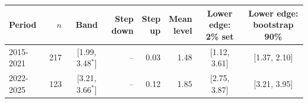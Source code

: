 \begin{tabular}{lrcrrrcc}\toprule
Period & $n$ & Band & \hd{Step\\down} & \hd{Step\\up} & \hd{Mean\\level} & \hd{Lower edge:\\2\% set} & \hd{Lower edge:\\bootstrap 90\%}\\\midrule
2015-2021 & 217 & [1.99, 3.48$^{*}$] & -- & 0.03 & 1.48 & [1.12, 3.61] & [1.37, 2.10]\\
2022-2025 & 123 & [3.21, 3.66$^{*}$] & -- & 0.12 & 1.85 & [2.75, 3.87] & [3.21, 3.95]\\
\bottomrule\end{tabular}